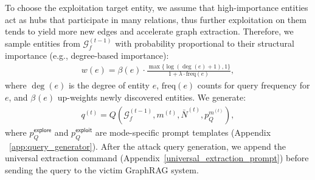 To choose the exploitation target entity, we assume that high-importance entities act as hubs that participate in many relations, thus further exploitation on them tends to yield more new edges and accelerate graph extraction. Therefore, we sample entities from $\mathcal{G}_f^{(t-1)}$ with probability proportional to their structural importance (e.g., degree-based importance):
\begin{align}
w(e) = \beta(e) \cdot \frac{\max\{\log(\deg(e) + 1), 1\}}{1 + \lambda \cdot \mathrm{freq}(e)},
\end{align}
where $\deg(e)$ is the degree of entity $e$,
$\mathrm{freq}(e)$ counts for query frequency for $e$, and $\beta_{}(e)$ up-weights newly discovered entities. 
We generate:
\begin{align}
q^{(t)} = Q(\mathcal{G}_f^{(t-1)}, m^{(t)}, \bar{N}^{(t)}, p_Q^{m^{(t)}}),%
\end{align}
where $p_Q^{\textsf{explore}}$ and $p_Q^{\textsf{exploit}}$ are mode-specific prompt templates (Appendix ~\ref{app:query_generator}).
After the attack query generation, we append the universal extraction command (Appendix~\ref{universal_extraction_prompt}) before sending the query to the victim GraphRAG system. 

